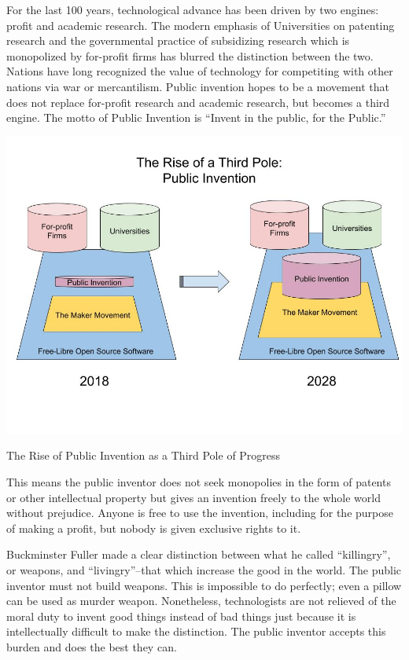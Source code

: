 \documentclass[
	fontsize=10pt, %
	twoside=false, %
	secnumdepth=1, %
]{kaobook}
\begin{document}
For the last 100 years, technological advance has been driven
by two engines: profit and academic research.
The modern emphasis of Universities on patenting research
and the governmental practice of subsidizing research which
is monopolized by for-profit firms has blurred the distinction between the two.
Nations have long recognized the value of technology for
competiting with other nations via
war or mercantilism. Public invention hopes to be a movement
that does not replace for-profit research and academic research,
but becomes a third engine. The motto of Public Invention
is ``Invent in the public, for the Public.''

\begin{marginfigure}[-5.5cm]
    \includegraphics{figures/The_Rise_of_Public_Invention.jpg}
  \caption{The Rise of Public Invention as a Third Pole of Progress}
\end{marginfigure}

This means the public inventor does not seek monopolies in
the form of patents or other intellectual property but
gives an invention freely to the whole world without prejudice.
Anyone is free to use the invention, including for the purpose
of making a profit, but nobody is given
exclusive rights to it.

Buckminster Fuller made a clear distinction between what he
called ``killingry'', or weapons, and ``livingry''--that
which increase the good in the world.
The public inventor
must not build weapons.
This is impossible
to do perfectly;
even a pillow can be used as murder weapon.
Nonetheless,
technologists are not relieved of the moral duty to invent
good things instead of bad things just because it is
intellectually difficult to make the distinction.
The public inventor accepts this burden and does the best they can.
\end{document}
